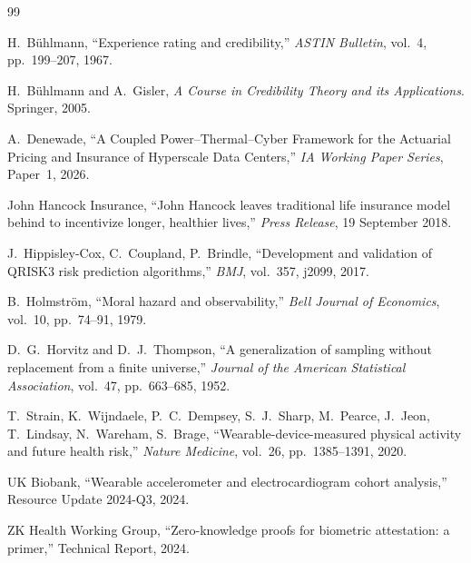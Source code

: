 \begin{thebibliography}{99}

H.~B\"uhlmann, ``Experience rating and credibility,''
\textit{ASTIN Bulletin}, vol.~4, pp.~199--207, 1967.

H.~B\"uhlmann and A.~Gisler, \textit{A Course in Credibility Theory
and its Applications}. Springer, 2005.

A.~Denewade, ``A Coupled Power--Thermal--Cyber Framework for the
Actuarial Pricing and Insurance of Hyperscale Data Centers,''
\textit{IA Working Paper Series}, Paper~1, 2026.

John Hancock Insurance, ``John Hancock leaves traditional life
insurance model behind to incentivize longer, healthier lives,''
\textit{Press Release}, 19 September 2018.

J.~Hippisley-Cox, C.~Coupland, P.~Brindle,
``Development and validation of QRISK3 risk prediction algorithms,''
\textit{BMJ}, vol.~357, j2099, 2017.

B.~Holmstr\"om, ``Moral hazard and observability,''
\textit{Bell Journal of Economics}, vol.~10, pp.~74--91, 1979.

D.~G.~Horvitz and D.~J.~Thompson, ``A generalization of sampling
without replacement from a finite universe,''
\textit{Journal of the American Statistical Association}, vol.~47,
pp.~663--685, 1952.

T.~Strain, K.~Wijndaele, P.~C.~Dempsey, S.~J.~Sharp, M.~Pearce,
J.~Jeon, T.~Lindsay, N.~Wareham, S.~Brage,
``Wearable-device-measured physical activity and future health risk,''
\textit{Nature Medicine}, vol.~26, pp.~1385--1391, 2020.

UK Biobank, ``Wearable accelerometer and electrocardiogram cohort
analysis,'' Resource Update 2024-Q3, 2024.

ZK Health Working Group, ``Zero-knowledge proofs for biometric
attestation: a primer,'' Technical Report, 2024.

\end{thebibliography}



